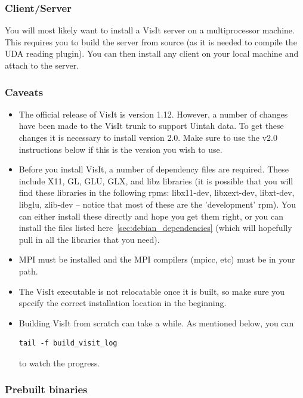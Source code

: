 \documentclass[12pt]{article}
\begin{document}
\subsubsection{Client/Server}
\label{subsec:ClientServer}

You will most likely want to install a VisIt server on a
multiprocessor machine. This requires you to build the server from
source (as it is needed to compile the UDA reading plugin). You can
then install any client on your local machine and attach to the
server.

\subsubsection{Caveats}
\label{subsec:VisIt_Caveats}
\begin{itemize}
\item The official release of VisIt is version 1.12.  However, a
  number of changes have been made to the VisIt trunk to support
  Uintah data. To get these changes it is necessary to install version
  2.0.  Make sure to use the v2.0 instructions below if this is the
  version you wish to use.
\item Before you install VisIt, a number of dependency files are
  required.  These include X11, GL, GLU, GLX, and libz libraries (it is possible
  that you will find these libraries in the following rpms:
  libx11-dev, libxext-dev, libxt-dev, libglu, zlib-dev -- notice that
  most of these are the 'development' rpm).  You can either install
  these directly and hope you get them right, or you can install the
  files listed here~\ref{sec:debian_dependencies} (which will
  hopefully pull in all the libraries that you need).
\item MPI must be installed and the MPI compilers (mpicc, etc) must be
  in your path.
\item The VisIt executable is not relocatable once it is built, so
  make sure you specify the correct installation location in the
  beginning.
\item Building VisIt from scratch can take a while.  As mentioned
  below, you can \begin{verbatim}tail -f build_visit_log\end{verbatim} to watch the progress.

\end{itemize}

\subsubsection{Prebuilt binaries}
\label{subsec:PrebuiltBinaries}
\end{document}
